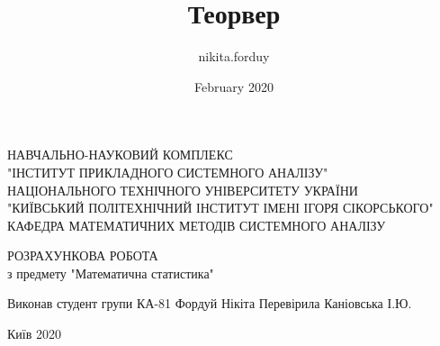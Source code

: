 \documentclass{article}
\title{Теорвер}
\author{nikita.forduy }
\date{February 2020}
\begin{document}
\pagestyle{empty}

\begin{titlepage}
    \thispagestyle{empty}
    \setlength{\parindent}{0ex} %
    
    \begin{center}
      НАВЧАЛЬНО-НАУКОВИЙ КОМПЛЕКС \\
      "ІНСТИТУТ ПРИКЛАДНОГО СИСТЕМНОГО АНАЛІЗУ" \\
      НАЦІОНАЛЬНОГО ТЕХНІЧНОГО УНІВЕРСИТЕТУ УКРАЇНИ \\
      "КИЇВСЬКИЙ ПОЛІТЕХНІЧНИЙ ІНСТИТУТ ІМЕНІ ІГОРЯ СІКОРСЬКОГО" \\
      \smallskip
      КАФЕДРА МАТЕМАТИЧНИХ МЕТОДІВ СИСТЕМНОГО АНАЛІЗУ \\
    \end{center}
    \vspace{60mm}
    
    \begin{center}
      РОЗРАХУНКОВА РОБОТА \\
      з предмету "Математична статистика" \\
    \end{center}
    
    \vspace{30mm}
    

    \hfill
    \begin{minipage}{.4\linewidth}
      \begin{flushright}
        Виконав студент групи КА-81
        Фордуй Нікіта
        \smallskip
        Перевірила Каніовська І.Ю.
      \end{flushright}
    \end{minipage}
    
    \vspace{10mm}

    \vfill
    \begin{center}
      Київ 2020
    \end{center}
    
    \setlength{\parindent}{5ex} %
\end{titlepage}

\pagestyle{plain}

\large
\end{document}
